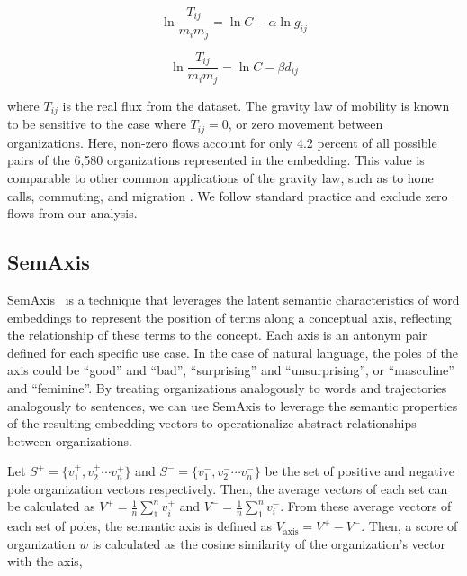 \documentclass[12pt]{article} %
\begin{document}
\begin{equation}
	\label{eq:linear_flux_geo}
	\ln\frac{T_{ij}}{m_im_j} = \ln C  - \alpha \ln g_{ij}
\end{equation}

\begin{equation}
	\label{eq:linear_flux_emb}
	\ln\frac{T_{ij}}{m_im_j} = \ln C - \beta d_{ij}
\end{equation}

where $T_{ij}$ is the real flux from the dataset. The gravity law of mobility is known to be sensitive to the case where $T_{ij} = 0$, or zero movement between organizations.
Here, non-zero flows account for only 4.2 percent of all possible pairs of the 6,580 organizations represented in the embedding.
This value is comparable to other common applications of the gravity law, such as to hone calls, commuting, and migration \autocite{simini2012universal}.
We follow standard practice and exclude zero flows from our analysis.



%
%
\subsection*{SemAxis}
SemAxis~\autocite{an2018semaxis} is a technique that leverages the latent semantic characteristics of word embeddings to represent the position of terms along a conceptual axis, reflecting the relationship of these terms to the concept.
Each axis is an antonym pair defined for each specific use case.
In the case of natural language, the poles of the axis could be ``good'' and ``bad'', ``surprising'' and ``unsurprising'', or ``masculine'' and ``feminine''. 
By treating organizations analogously to words and trajectories analogously to sentences, we can use SemAxis to leverage the semantic properties of the resulting embedding vectors to operationalize abstract relationships between organizations. 

Let $S^+ = \{v_1^+, v_2^+ \cdots v_n^+\}$ and $S^- =\{v_1^-, v_2^- \cdots v_n^-\}$ be the set of positive and negative pole organization vectors respectively. Then, the average vectors of each set can be calculated as $V^{+} = \frac{1}{n}\sum^n_1 v_i^+$ and $V^{-} = \frac{1}{n}\sum^n_1 v_i^-$. From these average vectors of each set of poles, the semantic axis is defined as $V_{\text{axis}} = V^{+} - V^{-}$. Then,  a score of organization $w$ is calculated as the cosine similarity of the organization's vector with the axis, 
\end{document}
